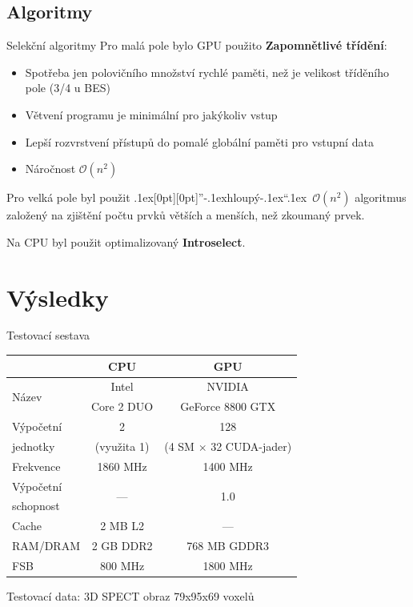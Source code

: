 \documentclass[compress,mathserif]{beamer}
\def\bq{\mbox{\kern.1ex\protect\raisebox{-1.3ex}[0pt][0pt]{''}\kern-.1ex}}
\def\eq{\mbox{\kern-.1ex``\kern.1ex}}
\theoremstyle{definition}
\theoremstyle{plain}
\newcommand{\beI}{\begin{itemize}}
\newcommand{\enI}{\end{itemize}}
\begin{document}
\subsection{Algoritmy}
     \begin{frame}{Selekční algoritmy}
      Pro malá pole bylo GPU použito \textbf{Zapomnětlivé třídění}:
      \beI
        \item Spotřeba jen polovičního množství rychlé paměti, než je velikost tříděního pole (3/4 u BES)
        \item Větvení programu je minimální pro jakýkoliv vstup
        \item Lepší rozvrstvení přístupů do pomalé globální paměti pro vstupní data
        \item Náročnost $\mathcal{O}(n^2)$
      \enI
      Pro velká pole byl použit \bq hloupý\eq~$\mathcal{O}(n^2)$ algoritmus založený na
      zjištění počtu prvků větších a menších, než zkoumaný prvek.
      \vspace{5pt}
      
      Na CPU byl použit optimalizovaný \textbf{Introselect}.
    \end{frame}


\section{Výsledky}
    \begin{frame}{Testovací sestava}
        \begin{table}
        \begin{tabular}{lcc}
          \toprule
          & CPU & GPU \\
          \midrule
          \multirow{2}{*}{Název} & Intel & NVIDIA \\
          & Core 2 DUO & GeForce 8800 GTX \\
          Výpočetní & 2 & 128 \\
          jednotky & (využita 1) & (4 SM $\times$ 32 CUDA-jader) \\
          Frekvence & 1860 MHz & 1400 MHz \\
          Výpočetní & \multirow{2}{*}{---} & \multirow{2}{*}{1.0} \\
          schopnost & & \\
          Cache & 2 MB L2 & --- \\
          RAM/DRAM & 2 GB DDR2 & 768 MB GDDR3 \\
          FSB & 800 MHz & 1800 MHz \\
          \bottomrule
        \end{tabular}
        \end{table}
        \begin{center}
           Testovací data: 3D SPECT obraz 79x95x69 voxelů
        \end{center}

    \end{frame}
\end{document}
